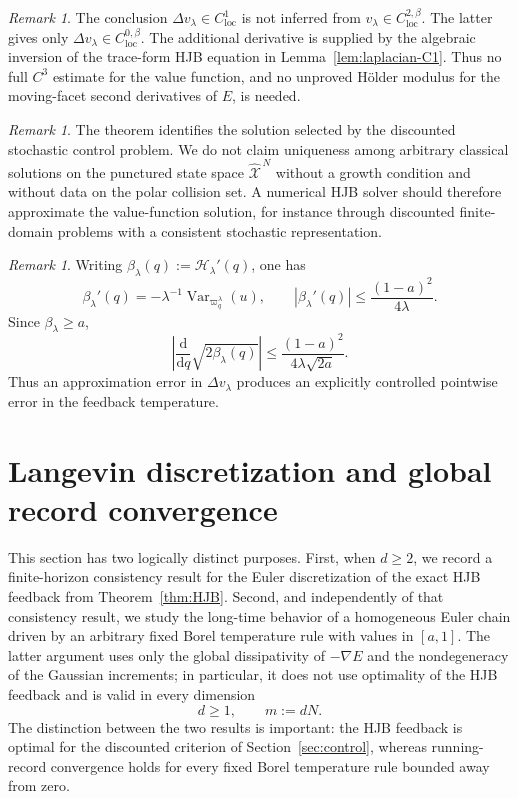 \documentclass[11pt]{article}
\def\Xc{{\mathcal X}}
\def\hX{\widehat{\Xc}^{\,N}}
\newcommand{\dd}{\mathrm{d}}
\theoremstyle{definition}
\theoremstyle{remark}
\newtheorem{remark}[theorem]{Remark}
\numberwithin{equation}{section}
\begin{document}
\begin{remark}\label{rem:regularity-feedback}
The conclusion $\Delta v_\lambda\in C_{\mathrm{loc}}^1$ is not inferred from
$v_\lambda\in C_{\mathrm{loc}}^{2,\beta}$.  The latter gives only
$\Delta v_\lambda\in C_{\mathrm{loc}}^{0,\beta}$.  The additional derivative is supplied by the
algebraic inversion of the trace-form HJB equation in Lemma~\ref{lem:laplacian-C1}.  Thus no full
$C^3$ estimate for the value function, and no unproved H\"older modulus for the moving-facet
second derivatives of $E$, is needed.
\end{remark}
\begin{remark}\label{rem:HJB-selection}
The theorem identifies the solution selected by the discounted stochastic control problem.  We do
not claim uniqueness among arbitrary classical solutions on the punctured state space $\hX$ without
a growth condition and without data on the polar collision set.  A numerical HJB solver should
therefore approximate the value-function solution, for instance through discounted finite-domain
problems with a consistent stochastic representation.
\end{remark}
\begin{remark}\label{rem:feedback-lipschitz}
Writing $\beta_\lambda(q):=\mathscr H_\lambda'(q)$, one has
\[
 \beta_\lambda'(q)
 =-\lambda^{-1}\operatorname{Var}_{\varpi_q^\lambda}(u),
 \qquad
 |\beta_\lambda'(q)|\le\frac{(1-a)^2}{4\lambda}.
\]
Since $\beta_\lambda\ge a$,
\begin{equation}\label{eq:h-feedback-Lipschitz-q}
 \left|\frac{\dd}{\dd q}\sqrt{2\beta_\lambda(q)}\right|
 \le\frac{(1-a)^2}{4\lambda\sqrt{2a}}.
\end{equation}
Thus an approximation error in $\Delta v_\lambda$ produces an explicitly controlled pointwise error
in the feedback temperature.
\end{remark}


\section{Langevin discretization and global record convergence}\label{sec:numerical}

This section has two logically distinct purposes.  First, when $d\ge2$, we record a
finite-horizon consistency result for the Euler discretization of the exact HJB feedback from
Theorem~\ref{thm:HJB}.  Second, and independently of that consistency result, we study the
long-time behavior of a homogeneous Euler chain driven by an arbitrary fixed Borel temperature
rule with values in $[a,1]$.  The latter argument uses only the global dissipativity of
$-\nabla E$ and the nondegeneracy of the Gaussian increments; in particular, it does not use
optimality of the HJB feedback and is valid in every dimension
\begin{equation}\label{eq:d-ge-1-discrete}
 d\ge1,
 \qquad
 m:=dN.
\end{equation}
The distinction between the two results is important: the HJB feedback is optimal for the
discounted criterion of Section~\ref{sec:control}, whereas running-record convergence holds for
every fixed Borel temperature rule bounded away from zero.
\end{document}
